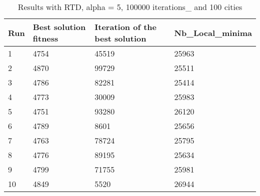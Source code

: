 \documentclass[12pt,oneside,a4paper]{article}
\begin{document}
  \begin{table}[h]
    \centering
    \small
    \begin{tabular}{llll}
      \hline
      \multicolumn{1}{|l|}{\textbf{Run}}& \multicolumn{1}{l|}{\textbf{Best solution fitness}}& \multicolumn{1}{l|}{\textbf{Iteration of the best solution}}& \multicolumn{1}{l|}{\textbf{Nb\_Local\_minima}}\\ \hline
      \multicolumn{1}{|l|}{1} & \multicolumn{1}{l|}{4754}  & \multicolumn{1}{l|}{45519} & \multicolumn{1}{l|}{25963}  \\ \hline
      \multicolumn{1}{|l|}{2} & \multicolumn{1}{l|}{4870}  & \multicolumn{1}{l|}{99729} & \multicolumn{1}{l|}{25511}  \\ \hline         
      \multicolumn{1}{|l|}{3} & \multicolumn{1}{l|}{4786}  & \multicolumn{1}{l|}{82281}  & \multicolumn{1}{l|}{25414}  \\ \hline
      \multicolumn{1}{|l|}{4} & \multicolumn{1}{l|}{4773}  & \multicolumn{1}{l|}{30009}  & \multicolumn{1}{l|}{25983}  \\ \hline
      \multicolumn{1}{|l|}{5} & \multicolumn{1}{l|}{4751}  & \multicolumn{1}{l|}{93280}  & \multicolumn{1}{l|}{26120}  \\ \hline
      \multicolumn{1}{|l|}{6} & \multicolumn{1}{l|}{4789}  & \multicolumn{1}{l|}{8601}  & \multicolumn{1}{l|}{25656}  \\ \hline
      \multicolumn{1}{|l|}{7} & \multicolumn{1}{l|}{4763}  & \multicolumn{1}{l|}{78724}  & \multicolumn{1}{l|}{25795}  \\ \hline
      \multicolumn{1}{|l|}{8} & \multicolumn{1}{l|}{4776}  & \multicolumn{1}{l|}{89195} & \multicolumn{1}{l|}{25634}  \\ \hline
      \multicolumn{1}{|l|}{9} & \multicolumn{1}{l|}{4799}  & \multicolumn{1}{l|}{71755} & \multicolumn{1}{l|}{25981}  \\ \hline
      \multicolumn{1}{|l|}{10} & \multicolumn{1}{l|}{4849}  & \multicolumn{1}{l|}{5520} & \multicolumn{1}{l|}{26944}  \\ \hline
    \end{tabular}
    \caption{Results with RTD, alpha = 5, 100000 iterations\_ and 100 cities}
  \end{table}
\end{document}
